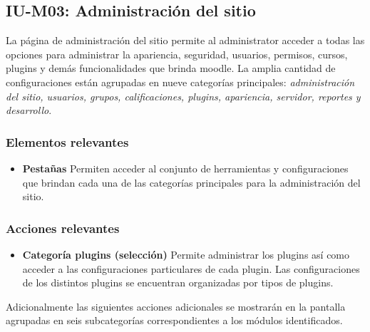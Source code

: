 
\subsection{IU-M03: Administración del sitio}

 La página de administración del sitio permite al administrator acceder a todas las opciones para
 administrar la apariencia, seguridad, usuarios, permisos, cursos, plugins y demás funcionalidades
 que brinda moodle. La amplia cantidad de configuraciones están agrupadas en nueve categorías
 principales: {\it administración del sitio, usuarios, grupos, calificaciones, plugins, apariencia,
 servidor, reportes y desarrollo}.


\subsubsection{Elementos relevantes}

    \begin{itemize}
    \item {\bf Pestañas}
        Permiten acceder al conjunto de herramientas y configuraciones que brindan
        cada una de las categorías principales para la administración del sitio.
    \end{itemize}

\subsubsection{Acciones relevantes}

    \begin{itemize}
    \item {\bf Categoría plugins (selección) }
        Permite administrar los plugins así como acceder a las configuraciones particulares de
        cada plugin. Las configuraciones de los distintos plugins se encuentran organizadas por
        tipos de plugins.
    \end{itemize}

 \noindent 
 Adicionalmente las siguientes acciones adicionales se mostrarán en la pantalla 
 agrupadas en seis subcategorías correspondientes a los módulos identificados.


